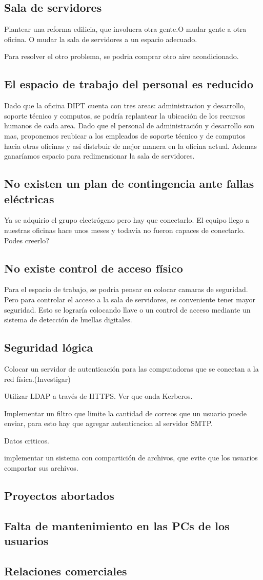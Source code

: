 \documentclass[a4paper,11pt,oneside]{article}
\begin{document}
\subsection*{Sala de servidores}
Plantear una reforma edilicia, que involucra otra gente.O mudar gente a otra oficina. O mudar la sala de servidores a un espacio adecuado.

Para resolver el otro problema, se podria comprar otro aire acondicionado.
\subsection*{El espacio de trabajo del personal es reducido}
Dado que la oficina DIPT cuenta con tres areas: administracion y desarrollo, soporte técnico y computos, se podría replantear la ubicación de los recursos humanos de cada area. Dado que el personal de administración y desarrollo son mas, proponemos reubicar a los empleados de soporte técnico y de computos hacia otras oficinas y así distrbuir de mejor manera en la oficina actual. Ademas ganaríamos espacio para redimensionar la sala de servidores.
\subsection*{No existen un plan de contingencia ante fallas eléctricas}
Ya se adquirio el grupo electrógeno pero hay que conectarlo. El equipo llego a nuestras oficinas hace unos meses y todavía no fueron capaces de conectarlo. Podes creerlo?
\subsection*{No existe control de acceso físico}
Para el espacio de trabajo, se podria pensar en colocar camaras de seguridad. Pero para controlar el acceso a la sala de servidores, es conveniente tener mayor seguridad. Esto se lograría colocando llave o un control de acceso mediante un sistema de detección de huellas digitales.
\subsection*{Seguridad lógica}
Colocar un servidor de autenticación para las computadoras que se conectan a la red física.(Investigar)

Utilizar LDAP a través de HTTPS. Ver que onda Kerberos.

Implementar un filtro que limite la cantidad de correos que un usuario puede enviar, para esto hay que agregar autenticacion al servidor SMTP.

Datos criticos.

implementar un sistema con compartición de archivos, que evite que los usuarios compartar sus archivos.

\subsection*{Proyectos abortados}
\subsection*{Falta de mantenimiento en las PCs de los usuarios}
\subsection*{Relaciones comerciales}
\end{document}
